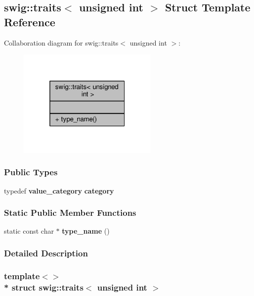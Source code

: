 \subsection{swig\+:\+:traits$<$ unsigned int $>$ Struct Template Reference}
\label{structswig_1_1traits_3_01unsigned_01int_01_4}


Collaboration diagram for swig\+:\+:traits$<$ unsigned int $>$\+:
\nopagebreak
\begin{figure}[H]
\begin{center}
\leavevmode
\includegraphics[width=193pt]{d6/d09/structswig_1_1traits_3_01unsigned_01int_01_4__coll__graph}
\end{center}
\end{figure}
\subsubsection*{Public Types}
\begin{DoxyCompactItemize}
\item 
typedef {\bf value\+\_\+category} {\bf category}
\end{DoxyCompactItemize}
\subsubsection*{Static Public Member Functions}
\begin{DoxyCompactItemize}
\item 
static const char $\ast$ {\bf type\+\_\+name} ()
\end{DoxyCompactItemize}


\subsubsection{Detailed Description}
\subsubsection*{template$<$$>$\\*
struct swig\+::traits$<$ unsigned int $>$}



